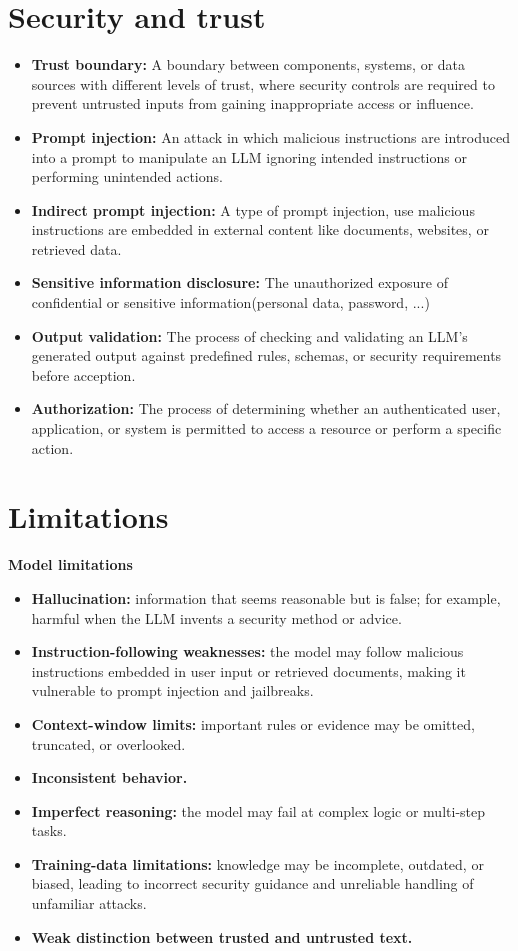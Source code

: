 \documentclass[a4paper,12pt]{report}
\begin{document}
\section{Security and trust}
\begin{itemize}
    \item \textbf{Trust boundary:} A boundary between components, systems, or data sources with different levels of trust, where security controls are required to prevent untrusted inputs from gaining inappropriate access or influence.
    \item \textbf{Prompt injection:} An attack in which malicious instructions are introduced into a prompt to manipulate an LLM ignoring intended instructions or performing unintended actions.
    \item \textbf{Indirect prompt injection:} A type of prompt injection, use malicious instructions are embedded in external content like documents, websites, or retrieved data.
    \item \textbf{Sensitive information disclosure:} The unauthorized exposure of confidential or sensitive information(personal data, password, ...)
    \item \textbf{Output validation:} The process of checking and validating an LLM's generated output against predefined rules, schemas, or security requirements before acception.
    \item \textbf{Authorization:} The process of determining whether an authenticated user, application, or system is permitted to access a resource or perform a specific action.
\end{itemize}

\section{Limitations}
\textbf{Model limitations}
    \begin{itemize}
        \item \textbf{Hallucination:} information that seems reasonable but is false; for example, harmful when the LLM invents a security method or advice.
        \item \textbf{Instruction-following weaknesses:} the model may follow malicious instructions embedded in user input or retrieved documents, making it vulnerable to prompt injection and jailbreaks.
        \item \textbf{Context-window limits:} important rules or evidence may be omitted, truncated, or overlooked.
        \item \textbf{Inconsistent behavior.}
        \item \textbf{Imperfect reasoning:} the model may fail at complex logic or multi-step tasks.
        \item \textbf{Training-data limitations:} knowledge may be incomplete, outdated, or biased, leading to incorrect security guidance and unreliable handling of unfamiliar attacks.
        \item \textbf{Weak distinction between trusted and untrusted text.}
    \end{itemize}
\end{document}
